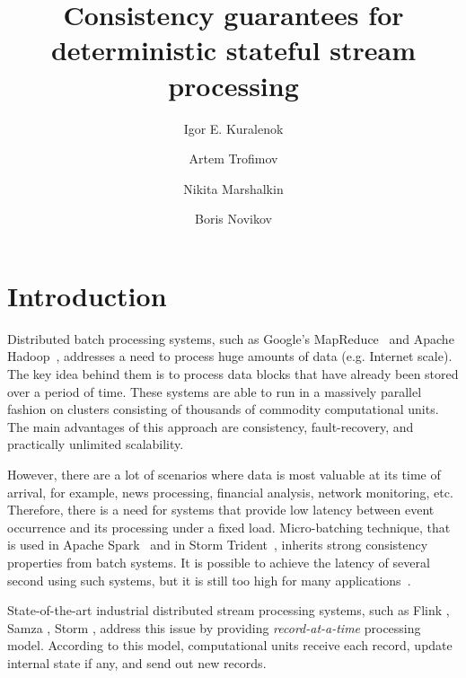 \documentclass{llncs}
\begin{document}
\title {Consistency guarantees for deterministic stateful stream processing}

\author{Igor E. Kuralenok \and Artem Trofimov \and Nikita Marshalkin \and Boris Novikov}

\maketitle


\begin{abstract}
\end{abstract}

\section {Introduction}
Distributed batch processing systems, such as Google's MapReduce~\cite{Dean:2008:MSD:1327452.1327492} and Apache Hadoop~\cite{hadoop2009hadoop}, addresses a need to process huge amounts of data (e.g. Internet scale). The key idea behind them is to process data blocks that have already been stored over a period of time. These systems are able to run in a massively parallel fashion on clusters consisting of thousands of commodity computational units. The main advantages of this approach are consistency, fault-recovery, and practically unlimited scalability.

However, there are a lot of scenarios where data is most valuable at its time of arrival, for example, news processing, financial analysis, network monitoring, etc. Therefore, there is a need for systems that provide low latency between event occurrence and its processing under a fixed load. Micro-batching technique, that is used in Apache Spark~\cite{Zaharia:2012:DSE:2342763.2342773} and in Storm Trident~\cite{apache:storm:trident}, inherits strong consistency properties from batch systems. It is possible to achieve the latency of several second using such systems, but it is still too high for many applications~\cite{?}.

State-of-the-art industrial distributed stream processing systems, such as Flink \cite{carbone2015apache}, Samza \cite{Noghabi:2017:SSS:3137765.3137770}, Storm \cite{apache:storm}, address this issue by providing {\it record-at-a-time} processing model. According to this model, computational units receive each record, update internal state if any, and send out new records. 
\end{document}
